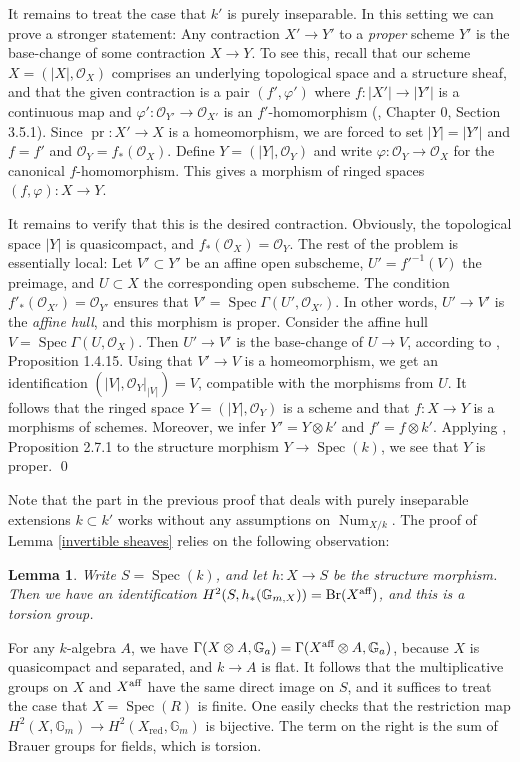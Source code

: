 \documentclass[oneside, 12pt]{amsart}
\newcommand\mylabel[1]{\label{#1}\marginpar{\vspace{-1ex}\medskip\medskip\footnotesize \tt #1}}
\renewcommand\mylabel[1]{\label{#1}}
\newtheorem{lemma}[theorem]{Lemma}
\theoremstyle{definition}
\theoremstyle{remark}
\newcommand{\GG}{\mathbb{G}}
\newcommand{\aff}{\text{\rm aff}}
\newcommand{\Br}{\operatorname{Br}}
\newcommand{\Num}{\operatorname{Num}}
\renewcommand{\O}{\mathscr{O}}
\newcommand{\pr}{\operatorname{pr}}
\newcommand{\ra}{\rightarrow}
\newcommand{\red}{{\operatorname{red}}}
\newcommand{\Spec}{\operatorname{Spec}}
\begin{document}
It remains to treat the case that $k'$ is purely inseparable.
In this setting we can prove a    stronger statement:
Any contraction $X'\ra Y'$ to a \emph{proper}  scheme $Y'$ is the base-change of some contraction $X\ra Y$.
To see this, recall that our scheme $X=(|X|,\O_X)$ comprises an underlying topological space and a structure sheaf,
and that the given contraction is a pair $(f',\varphi')$ where $f:|X'|\ra |Y'| $ is a continuous map  and
$\varphi':\O_{Y'}\ra\O_{X'}$ is an $f'$-homomorphism (\cite{EGA I}, Chapter 0, Section 3.5.1).
Since $\pr:X'\ra X$ is a homeomorphism, we are forced to set  $|Y|=|Y'|$ and $f=f'$  and   $\O_Y=f_*(\O_X)$.
Define $Y=(|Y|,\O_Y)$ and write  $\varphi:\O_Y\ra\O_X$ for the canonical $f$-homomorphism.
This gives a morphism   of ringed spaces $(f,\varphi):X\ra Y$.

It remains to verify that this is the desired contraction. Obviously, the topological space $|Y|$ is quasicompact, and $f_*(\O_X)=\O_Y$.
The rest of the  problem is essentially local: Let $V'\subset Y'$ be an affine open subscheme,  $U'=f'^{-1}(V)$ the preimage, 
and $U\subset X$ the corresponding open subscheme. 
The condition $f'_*(\O_{X'})=\O_{Y'}$ ensures that    
$V'=\Spec\Gamma(U',\O_{X'})$. In other words, $U'\ra V'$ is the \emph{affine hull}, and this morphism is proper.
Consider the affine hull $V=\Spec\Gamma(U,\O_X)$. Then $U'\ra V'$ is the base-change of $U\ra V$, according to \cite{EGA IIIa}, Proposition 1.4.15.
Using that $V'\ra V$ is a homeomorphism, we get an identification $(|V|,\O_Y|_{|V|})=V$, compatible with the morphisms from $U$.
It follows that the ringed space $Y=(|Y|,\O_Y)$
is a scheme and that $f:X\ra Y$ is a morphisms of schemes.  Moreover, we infer $Y'=Y\otimes k'$ and $f'=f\otimes k'$.
Applying \cite{EGA IVb}, Proposition 2.7.1 to the structure morphism $Y\ra \Spec(k)$, we see that $Y$ is proper.
\qed

\medskip
Note that the    part in the  previous proof that  deals with purely inseparable extensions $k\subset k'$ 
works without any assumptions on $\Num_{X/k}$. 
The  proof of Lemma \ref{invertible sheaves} relies on  the following observation:

\begin{lemma}
\mylabel{brauer group}
Write $S=\Spec(k)$, and let $h:X\ra S$ be the structure morphism. Then we have an identification $H^2(S,h_*(\GG_{m,X}))=\Br(X^\aff)$,
and this is a torsion group.
\end{lemma}

\proof
For any $k$-algebra $A$, we have $\Gamma(X\otimes A,\GG_a)=\Gamma(X^\aff\otimes A,\GG_a)$,
because $X$ is   quasicompact and separated, and $k\ra A$ is flat.  It follows that the multiplicative groups
on $X$ and $X^\aff$ have the same direct image on $S$, and it suffices to treat the case that $X=\Spec(R)$ is finite.
One easily checks that the restriction map $H^2(X,\GG_m)\ra H^2(X_\red,\GG_m)$ is bijective.
The term on the right is the sum of Brauer groups for  fields, which is torsion.
\end{document}
